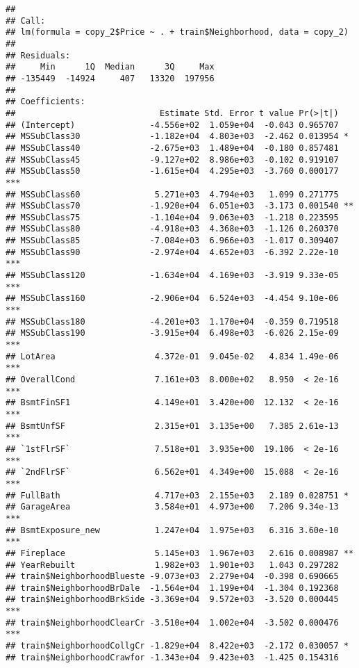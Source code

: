 \documentclass[]{article}
\begin{document}
\begin{verbatim}
## 
## Call:
## lm(formula = copy_2$Price ~ . + train$Neighborhood, data = copy_2)
## 
## Residuals:
##     Min      1Q  Median      3Q     Max 
## -135449  -14924     407   13320  197956 
## 
## Coefficients:
##                             Estimate Std. Error t value Pr(>|t|)    
## (Intercept)               -4.556e+02  1.059e+04  -0.043 0.965707    
## MSSubClass30              -1.182e+04  4.803e+03  -2.462 0.013954 *  
## MSSubClass40              -2.675e+03  1.489e+04  -0.180 0.857481    
## MSSubClass45              -9.127e+02  8.986e+03  -0.102 0.919107    
## MSSubClass50              -1.615e+04  4.295e+03  -3.760 0.000177 ***
## MSSubClass60               5.271e+03  4.794e+03   1.099 0.271775    
## MSSubClass70              -1.920e+04  6.051e+03  -3.173 0.001540 ** 
## MSSubClass75              -1.104e+04  9.063e+03  -1.218 0.223595    
## MSSubClass80              -4.918e+03  4.368e+03  -1.126 0.260370    
## MSSubClass85              -7.084e+03  6.966e+03  -1.017 0.309407    
## MSSubClass90              -2.974e+04  4.652e+03  -6.392 2.22e-10 ***
## MSSubClass120             -1.634e+04  4.169e+03  -3.919 9.33e-05 ***
## MSSubClass160             -2.906e+04  6.524e+03  -4.454 9.10e-06 ***
## MSSubClass180             -4.201e+03  1.170e+04  -0.359 0.719518    
## MSSubClass190             -3.915e+04  6.498e+03  -6.026 2.15e-09 ***
## LotArea                    4.372e-01  9.045e-02   4.834 1.49e-06 ***
## OverallCond                7.161e+03  8.000e+02   8.950  < 2e-16 ***
## BsmtFinSF1                 4.149e+01  3.420e+00  12.132  < 2e-16 ***
## BsmtUnfSF                  2.315e+01  3.135e+00   7.385 2.61e-13 ***
## `1stFlrSF`                 7.518e+01  3.935e+00  19.106  < 2e-16 ***
## `2ndFlrSF`                 6.562e+01  4.349e+00  15.088  < 2e-16 ***
## FullBath                   4.717e+03  2.155e+03   2.189 0.028751 *  
## GarageArea                 3.584e+01  4.973e+00   7.206 9.34e-13 ***
## BsmtExposure_new           1.247e+04  1.975e+03   6.316 3.60e-10 ***
## Fireplace                  5.145e+03  1.967e+03   2.616 0.008987 ** 
## YearRebuilt                1.982e+03  1.901e+03   1.043 0.297282    
## train$NeighborhoodBlueste -9.073e+03  2.279e+04  -0.398 0.690665    
## train$NeighborhoodBrDale  -1.564e+04  1.199e+04  -1.304 0.192368    
## train$NeighborhoodBrkSide -3.369e+04  9.572e+03  -3.520 0.000445 ***
## train$NeighborhoodClearCr -3.510e+04  1.002e+04  -3.502 0.000476 ***
## train$NeighborhoodCollgCr -1.829e+04  8.422e+03  -2.172 0.030057 *  
## train$NeighborhoodCrawfor -1.343e+04  9.423e+03  -1.425 0.154316    

\end{verbatim}
\end{document}
